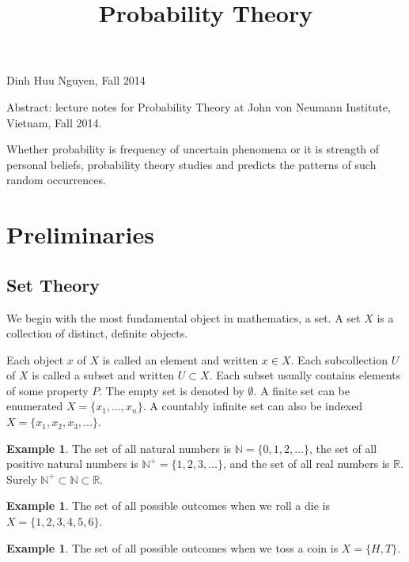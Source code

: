 \documentclass[12pt]{amsart}
\title{Probability Theory}
\theoremstyle{definition}
\newtheorem{example}[theorem]{Example}
\begin{document}
\maketitle

\begin{center}Dinh Huu Nguyen, Fall 2014\end{center}
\vspace{20pt}

Abstract: lecture notes for Probability Theory at John von Neumann Institute, Vietnam, Fall 2014.

\tableofcontents

Whether probability is frequency of uncertain phenomena or it is strength of personal beliefs, probability theory studies and predicts the patterns of such random occurrences.

\section{Preliminaries}

\subsection{Set Theory} We begin with the most fundamental object in mathematics, a set.
\dfn A set $X$ is a collection of distinct, definite objects.

Each object $x$ of $X$ is called an element and written $x \in X$. Each subcollection $U$ of $X$ is called a subset and written $U \subset X$. Each subset usually contains elements of some property $P$. The empty set is denoted by $\emptyset$. A finite set can be enumerated $X = \{x_1, \dots , x_n\}$. A countably infinite set can also be indexed $X= \{x_1, x_2, x_3, ...\}$.

\begin{example} The set of all natural numbers is $\mathbb{N} = \{0, 1, 2, \dots \}$, the set of all positive natural numbers is $\mathbb{N}^+ = \{1, 2, 3, \dots \}$, and the set of all real numbers is $\mathbb{R}$. Surely $\mathbb{N}^+ \subset \mathbb{N} \subset \mathbb{R}$.
\end{example}

\begin{example} The set of all possible outcomes when we roll a die is $X = \{1, 2, 3, 4, 5, 6\}$.
\end{example}

\begin{example} The set of all possible outcomes when we toss a coin is $X = \{H, T\}$. 
\end{example}
\end{document}
